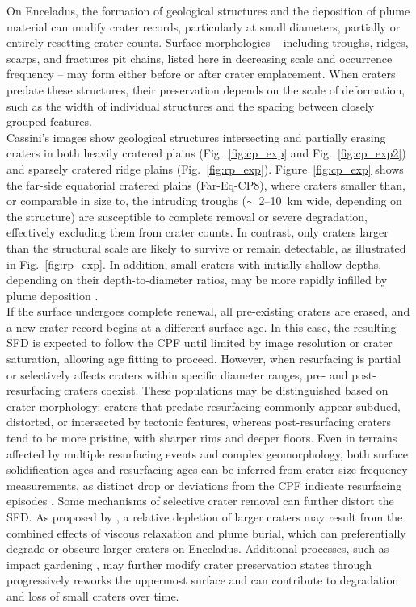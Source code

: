\documentclass[preprint,11pt,3p,times,authoryear]{elsarticle}
\begin{document}
On Enceladus, the formation of geological structures and the deposition of plume material can modify crater records, particularly at small diameters, partially or entirely resetting crater counts. Surface morphologies -- including troughs, ridges, scarps, and fractures pit chains, listed here in decreasing scale and occurrence frequency \citep{CrowWillard2015, Martin2023} -- may form either before or after crater emplacement. When craters predate these structures, their preservation depends on the scale of deformation, such as the width of individual structures and the spacing between closely grouped features.\\

Cassini's images show geological structures intersecting and partially erasing craters in both heavily cratered plains (Fig.~\ref{fig:cp_exp} and Fig.~\ref{fig:cp_exp2}) and sparsely cratered ridge plains (Fig.~\ref{fig:rp_exp}). Figure~\ref{fig:cp_exp} shows the far-side equatorial cratered plains (Far-Eq-CP8), where craters smaller than, or comparable in size to, the intruding troughs ($\sim$ 2–10~km wide, depending on the structure) are susceptible to complete removal or severe degradation, effectively excluding them from crater counts. In contrast, only craters larger than the structural scale are likely to survive or remain detectable, as illustrated in Fig.~\ref{fig:rp_exp}. In addition, small craters with initially shallow depths, depending on their depth-to-diameter ratios, may be more rapidly infilled by plume deposition \citep{Kirchoff2009}.\\

If the surface undergoes complete renewal, all pre-existing craters are erased, and a new crater record begins at a different surface age. In this case, the resulting SFD is expected to follow the CPF until limited by image resolution or crater saturation, allowing age fitting to proceed. However, when resurfacing is partial or selectively affects craters within specific diameter ranges, pre- and post-resurfacing craters coexist. These populations may be distinguished based on crater morphology: craters that predate resurfacing commonly appear subdued, distorted, or intersected by tectonic features, whereas post-resurfacing craters tend to be more pristine, with sharper rims and deeper floors. Even in terrains affected by multiple resurfacing events and complex geomorphology, both surface solidification ages and resurfacing ages can be inferred from crater size-frequency measurements, as distinct drop or deviations from the CPF indicate resurfacing episodes \citep{Michael2010}. 
Some mechanisms of selective crater removal can further distort the SFD. As proposed by \citet{Kirchoff2009}, a relative depletion of larger craters may result from the combined effects of viscous relaxation and plume burial, which can preferentially degrade or obscure larger craters on Enceladus. 
Additional processes, such as impact gardening \citep[e.g.][]{Costello2021}, may further modify crater preservation states through progressively reworks the uppermost surface and can contribute to degradation and loss of small craters over time.\\
\end{document}
